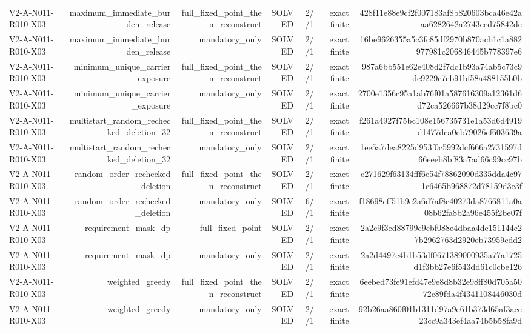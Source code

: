 {\begin{longtable}{lrrrrrr}
V2-A-N011-R010-X03 & maximum\_immediate\_burden\_release & full\_fixed\_point\_then\_reconstruct & SOLVED & 2//1 & exact finite & 428f11e88e9cf2f007183af8b820603bca46e42aaa6282642a2743eed75842de \\
V2-A-N011-R010-X03 & maximum\_immediate\_burden\_release & mandatory\_only & SOLVED & 2//1 & exact finite & 16be9626355a5c3fc85df2970b870acb1c1a882977981c206846445b778397e6 \\
V2-A-N011-R010-X03 & minimum\_unique\_carrier\_exposure & full\_fixed\_point\_then\_reconstruct & SOLVED & 2//1 & exact finite & 987a6bb551e62e408d2f7dc1b93a74ab5c73c9dc9229c7eb91bf58a488155b0b \\
V2-A-N011-R010-X03 & minimum\_unique\_carrier\_exposure & mandatory\_only & SOLVED & 2//1 & exact finite & 2700e1356c95a1ab76f01a587616309a12361d6d72ca526667b38d29cc7f8bc0 \\
V2-A-N011-R010-X03 & multistart\_random\_rechecked\_deletion\_32 & full\_fixed\_point\_then\_reconstruct & SOLVED & 2//1 & exact finite & f261a4927f75bc108e156735731e1a53d6d4919d1477dca0cb79026cf603639a \\
V2-A-N011-R010-X03 & multistart\_random\_rechecked\_deletion\_32 & mandatory\_only & SOLVED & 2//1 & exact finite & 1ee5a7dea8225d953f0c5992dcf666a2731597d66eeeb8bf83a7ad66c99cc97b \\
V2-A-N011-R010-X03 & random\_order\_rechecked\_deletion & full\_fixed\_point\_then\_reconstruct & SOLVED & 2//1 & exact finite & c271629f63134fff6e54f78862090d335dda4c971c6465b968872d78159d3e3f \\
V2-A-N011-R010-X03 & random\_order\_rechecked\_deletion & mandatory\_only & SOLVED & 6//1 & exact finite & f18698cff51b9c2a6d7af8c40273da8766811a0a08b62fa8b2a96e455f2be07f \\
V2-A-N011-R010-X03 & requirement\_mask\_dp & full\_fixed\_point & SOLVED & 2//1 & exact finite & 2a2c9f3ed88799c9cbf088e4dbaa4de151144e27b2962763d2920eb73959cdd2 \\
V2-A-N011-R010-X03 & requirement\_mask\_dp & mandatory\_only & SOLVED & 2//1 & exact finite & 2a2d4497e4b1b53df0671389000935a77a1725d1f3bb27e6f543dd61c0cbe126 \\
V2-A-N011-R010-X03 & weighted\_greedy & full\_fixed\_point\_then\_reconstruct & SOLVED & 2//1 & exact finite & 6eebed73fe91efd47e9e8d8b32e98ff80d705a5072c89fda4f4341108446030d \\
V2-A-N011-R010-X03 & weighted\_greedy & mandatory\_only & SOLVED & 2//1 & exact finite & 92b26aa860f01b1311d97a9e61b373d65af3ace23cc9a343ef4aa74b5b58fa9d \\

\end{longtable}}
